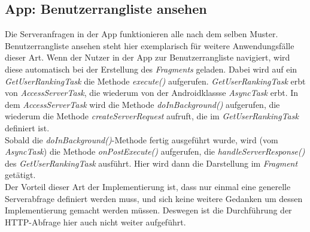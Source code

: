 \subsection{App: Benutzerrangliste ansehen}
Die Serveranfragen in der App funktionieren alle nach dem selben Muster. Benutzerrangliste ansehen steht hier exemplarisch für weitere Anwendungsfälle dieser Art.
Wenn der Nutzer in der App zur Benutzerrangliste navigiert, wird diese automatisch bei der Erstellung des \emph{Fragments} geladen. Dabei wird auf ein \emph{GetUserRankingTask} die Methode \emph{execute()} aufgerufen. \emph{GetUserRankingTask} erbt von \emph{AccessServerTask}, die wiederum von der Androidklassse \emph{AsyncTask} erbt. In dem \emph{AccessServerTask} wird die Methode \emph{doInBackground()} aufgerufen, die wiederum die Methode \emph{createServerRequest} aufruft, die im \emph{GetUserRankingTask} definiert ist.\\
Sobald die \emph{doInBackground()}-Methode fertig ausgeführt wurde, wird (vom \emph{AsyncTask}) die Methode \emph{onPostExecute()} aufgerufen, die \emph{handleServerResponse()} des \emph{GetUserRankingTask} ausführt. Hier wird dann die Darstellung im \emph{Fragment} getätigt.\\
Der Vorteil dieser Art der Implementierung ist, dass nur einmal eine generelle Serverabfrage definiert werden muss, und sich keine weitere Gedanken um dessen Implementierung gemacht werden m\"ussen. Deswegen ist die Durchführung der HTTP-Abfrage hier auch nicht weiter aufgeführt.